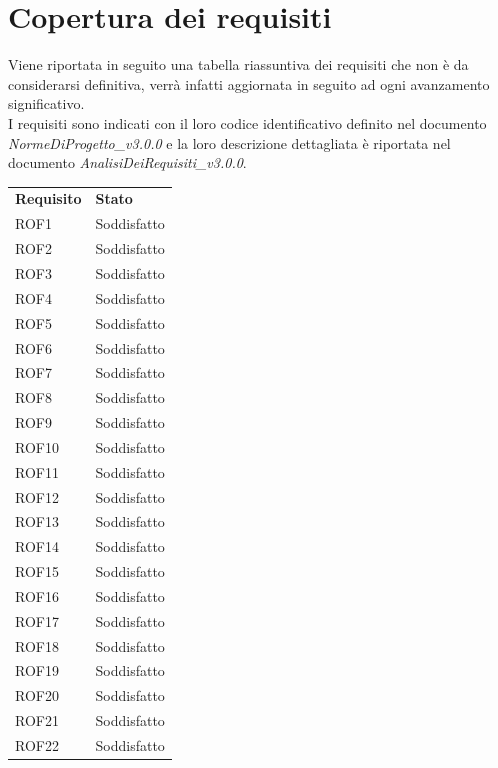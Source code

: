 \section{Copertura dei requisiti}
Viene riportata in seguito una tabella riassuntiva dei requisiti che non è da considerarsi definitiva, verrà infatti aggiornata in seguito ad ogni avanzamento significativo. \\
I requisiti sono indicati con il loro codice identificativo definito nel documento \textit{NormeDiProgetto\_v3.0.0} e la loro descrizione dettagliata è riportata nel documento \textit{AnalisiDeiRequisiti\_v3.0.0}.
\begin{longtable}{| p{2.5cm} | p{3cm} |}
	\rowcolor{LightBlue}
	\color{white}\bfseries Requisito & \color{white}\bfseries Stato \\
	ROF1 & Soddisfatto \\ \hline
	\rowcolor{LightGray}
	ROF2 & Soddisfatto \\ \hline
	ROF3 & Soddisfatto \\ \hline
	\rowcolor{LightGray}
	ROF4 & Soddisfatto \\ \hline
	ROF5 & Soddisfatto \\ \hline
	\rowcolor{LightGray}
	ROF6 & Soddisfatto \\ \hline
	ROF7 & Soddisfatto \\ \hline
	\rowcolor{LightGray}
	ROF8 & Soddisfatto \\ \hline
	ROF9 & Soddisfatto \\ \hline
	\rowcolor{LightGray}
	ROF10 & Soddisfatto \\ \hline
	ROF11 & Soddisfatto \\ \hline
	\rowcolor{LightGray}
	ROF12 & Soddisfatto \\ \hline
	ROF13 & Soddisfatto \\ \hline
	\rowcolor{LightGray}
	ROF14 & Soddisfatto \\ \hline
	ROF15 & Soddisfatto \\ \hline
	\rowcolor{LightGray}
	ROF16 & Soddisfatto \\ \hline
	ROF17 & Soddisfatto \\ \hline
	\rowcolor{LightGray}
	ROF18 & Soddisfatto \\ \hline
	ROF19 & Soddisfatto \\ \hline
	\rowcolor{LightGray}
	ROF20 & Soddisfatto \\ \hline
	ROF21 & Soddisfatto \\ \hline
	\rowcolor{LightGray}
	ROF22 & Soddisfatto \\ \hline

\end{longtable}

